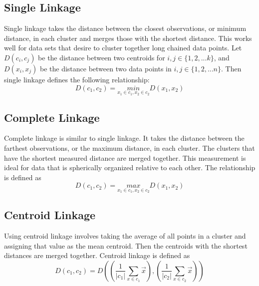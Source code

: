\documentclass[../tech_report_1.tex]{subfiles}
\begin{document}
\subsection{Single Linkage}

Single linkage takes the distance between the closest observations,
or minimum distance, in each cluster and merges those with the
shortest distance. This works well for data sets that desire to cluster
together long chained data points. Let $D(c_i,c_j)$ be the distance between two centroids for $i,j \in \{1, 2, ... k\}$, and $D(x_i, x_j)$ be the distance between two data points in $i, j \in \{ 1, 2, ... n \}$. Then single linkage defines the following relationship:
\begin{equation}
D(c_{1},c_{2})=\underset{x_{1}\in c_{1},x_{2}\in c_{2}}{min}D(x_{1},x_{2})
\end{equation}



\subsection{Complete Linkage}

Complete linkage is similar to single linkage. It takes the distance
between the farthest observations, or the maximum distance, in each
cluster. The clusters that have the shortest measured distance are
merged together. This measurement is ideal for data that is spherically
organized relative to each other. The relationship is defined as
\begin{equation}
D(c_{1},c_{2})=\underset{x_{1}\in c_{1},x_{2}\in c_{2}}{max}D(x_{1},x_{2})
\end{equation}



\subsection{Centroid Linkage}

Using centroid linkage involves taking the average of all points in
a cluster and assigning that value as the mean centroid. Then
the centroids with the shortest distances are merged together.
Centroid linkage is defined as
\begin{equation}
D(c_{1},c_{2})
=
D\left(
  \left(\frac{1}{|c_{1}|}\sum_{x\in c_{1}}\overset{\rightarrow}{x}\right),
  \left(\frac{1}{|c_{2}|}\sum_{x\in c_{2}}\overset{\rightarrow}{x}\right)
\right)
\end{equation}
\end{document}
